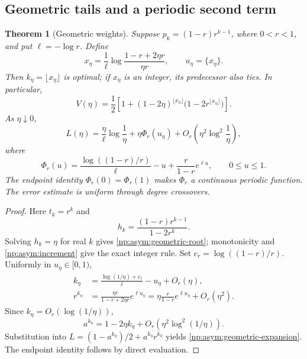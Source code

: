 \documentclass[11pt,a4paper]{article}
\newtheorem{theorem}{Theorem}[section]
\theoremstyle{definition}
\theoremstyle{remark}
\begin{document}
\FloatBarrier
\subsection{Geometric tails and a periodic second term}
\label{np:asym:geometric}

\begin{theorem}[Geometric weights]
\label{np:asym:geometric-theorem}
Suppose $p_k=(1-r)r^{k-1}$, where $0<r<1$, and put $\ell=-\log r$.
Define
\begin{equation}
 x_\eta=\frac1\ell\log\frac{1-r+2\eta r}{\eta r},
 \qquad u_\eta=\{x_\eta\}.
 \label{np:asym:geometric-root}
\end{equation}
Then $k_\eta=\lfloor x_\eta\rfloor$ is optimal; if $x_\eta$ is an
integer, its predecessor also ties.  In particular,
\[
 V(\eta)=\frac12\left[1+(1-2\eta)^{\lfloor x_\eta\rfloor}
                           \bigl(1-2r^{\lfloor x_\eta\rfloor}\bigr)\right].
\]
As $\eta\downarrow0$,
\begin{equation}
 L(\eta)=\frac{\eta}{\ell}\log\frac1\eta
          +\eta\Phi_r(u_\eta)
          +O_r\!\left(\eta^2\log^2\frac1\eta\right),
 \label{np:asym:geometric-expansion}
\end{equation}
where
\begin{equation}
 \Phi_r(u)=\frac{\log((1-r)/r)}{\ell}
                -u+\frac{r}{1-r}e^{\ell u},\qquad 0\leq u\leq1.
 \label{np:asym:geometric-periodic}
\end{equation}
The endpoint identity $\Phi_r(0)=\Phi_r(1)$ makes $\Phi_r$ a continuous
periodic function.  The error estimate is uniform through degree
crossovers.
\end{theorem}

\begin{proof}
Here $t_k=r^k$ and
\[
 h_k=\frac{(1-r)r^{k-1}}{1-2r^k}.
\]
Solving $h_k=\eta$ for real $k$ gives
\eqref{np:asym:geometric-root}; monotonicity and
\eqref{np:asym:increment} give the exact integer rule.
Set $c_r=\log((1-r)/r)$.  Uniformly in $u_\eta\in[0,1)$,
\begin{align*}
 k_\eta&=\frac{\log(1/\eta)+c_r}{\ell}-u_\eta+O_r(\eta),\\
 r^{k_\eta}
 &=\frac{\eta r}{1-r+2\eta r}e^{\ell u_\eta}
   =\eta\frac{r}{1-r}e^{\ell u_\eta}+O_r(\eta^2).
\end{align*}
Since $k_\eta=O_r(\log(1/\eta))$,
\[
 a^{k_\eta}=1-2\eta k_\eta
                   +O_r\!\left(\eta^2\log^2(1/\eta)\right).
\]
Substitution into $L=(1-a^{k_\eta})/2+a^{k_\eta}r^{k_\eta}$ yields
\eqref{np:asym:geometric-expansion}.  The endpoint identity follows
by direct evaluation.
\end{proof}
\end{document}
